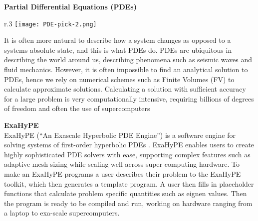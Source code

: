 \textbf{Partial Differential Equations (PDEs)}\\
\begin{wrapfigure}{r}{.3\textwidth}
        \texttt{[image: PDE-pick-2.png]}
\end{wrapfigure}
It is often more natural to describe how a system changes as opposed to a systems absolute state, and this is what PDEs do.
PDEs are ubiquitous in describing the world around us, describing 
phenomena such as seismic waves and fluid mechanics.
However, it is often impossible to find an analytical solution to PDEs, hence we rely 
on numerical schemes such as Finite Volumes (FV) to calculate approximate 
solutions.
Calculating a solution with sufficient accuracy for a large problem is very computationally intensive, requiring billions of degrees of freedom and often the use of supercomputers

\phantom{ }

\textbf{ExaHyPE}\\
ExaHyPE (``An Exascale Hyperbolic PDE Engine'') is a software engine for solving systems of first-order hyperbolic PDEs \cite{exahype}.
ExaHyPE enables users to create highly sophisticated PDE solvers with ease, 
supporting complex features such as adaptive mesh sizing while scaling well across 
super computing hardware.
To make an ExaHyPE programs a user describes their problem to the ExaHyPE toolkit, which then generates a template program.
A user then fills in placeholder functions that calculate problem specific quantities such as eignen values.
Then the program is ready to be compiled and run, working on hardware ranging from a laptop to exa-scale supercomputers.



